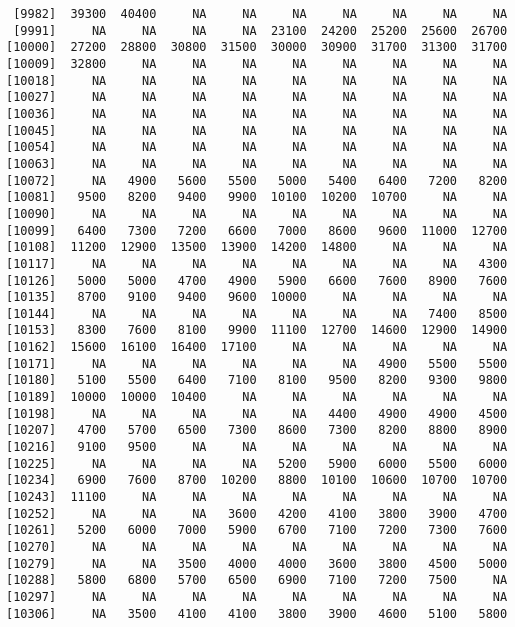 \documentclass[]{article}
\begin{document}
\begin{verbatim}
 [9982]  39300  40400     NA     NA     NA     NA     NA     NA     NA
 [9991]     NA     NA     NA     NA  23100  24200  25200  25600  26700
[10000]  27200  28800  30800  31500  30000  30900  31700  31300  31700
[10009]  32800     NA     NA     NA     NA     NA     NA     NA     NA
[10018]     NA     NA     NA     NA     NA     NA     NA     NA     NA
[10027]     NA     NA     NA     NA     NA     NA     NA     NA     NA
[10036]     NA     NA     NA     NA     NA     NA     NA     NA     NA
[10045]     NA     NA     NA     NA     NA     NA     NA     NA     NA
[10054]     NA     NA     NA     NA     NA     NA     NA     NA     NA
[10063]     NA     NA     NA     NA     NA     NA     NA     NA     NA
[10072]     NA   4900   5600   5500   5000   5400   6400   7200   8200
[10081]   9500   8200   9400   9900  10100  10200  10700     NA     NA
[10090]     NA     NA     NA     NA     NA     NA     NA     NA     NA
[10099]   6400   7300   7200   6600   7000   8600   9600  11000  12700
[10108]  11200  12900  13500  13900  14200  14800     NA     NA     NA
[10117]     NA     NA     NA     NA     NA     NA     NA     NA   4300
[10126]   5000   5000   4700   4900   5900   6600   7600   8900   7600
[10135]   8700   9100   9400   9600  10000     NA     NA     NA     NA
[10144]     NA     NA     NA     NA     NA     NA     NA   7400   8500
[10153]   8300   7600   8100   9900  11100  12700  14600  12900  14900
[10162]  15600  16100  16400  17100     NA     NA     NA     NA     NA
[10171]     NA     NA     NA     NA     NA     NA   4900   5500   5500
[10180]   5100   5500   6400   7100   8100   9500   8200   9300   9800
[10189]  10000  10000  10400     NA     NA     NA     NA     NA     NA
[10198]     NA     NA     NA     NA     NA   4400   4900   4900   4500
[10207]   4700   5700   6500   7300   8600   7300   8200   8800   8900
[10216]   9100   9500     NA     NA     NA     NA     NA     NA     NA
[10225]     NA     NA     NA     NA   5200   5900   6000   5500   6000
[10234]   6900   7600   8700  10200   8800  10100  10600  10700  10700
[10243]  11100     NA     NA     NA     NA     NA     NA     NA     NA
[10252]     NA     NA     NA   3600   4200   4100   3800   3900   4700
[10261]   5200   6000   7000   5900   6700   7100   7200   7300   7600
[10270]     NA     NA     NA     NA     NA     NA     NA     NA     NA
[10279]     NA     NA   3500   4000   4000   3600   3800   4500   5000
[10288]   5800   6800   5700   6500   6900   7100   7200   7500     NA
[10297]     NA     NA     NA     NA     NA     NA     NA     NA     NA
[10306]     NA   3500   4100   4100   3800   3900   4600   5100   5800

\end{verbatim}
\end{document}
